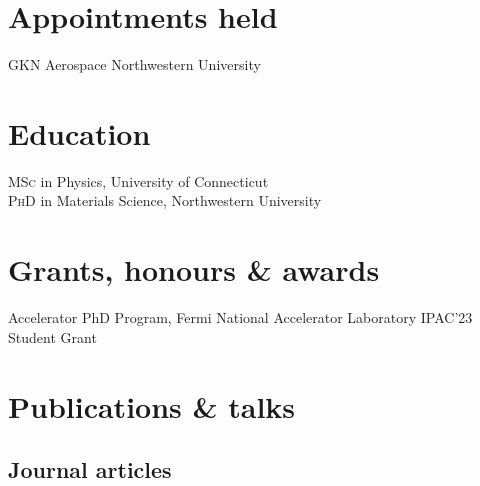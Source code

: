 \documentclass[11pt]{article} %
\begin{document}

\section*{Appointments held}

GKN Aerospace
Northwestern University


\section*{Education}

\textsc{MSc} in Physics, University of Connecticut\\
\textsc{PhD} in Materials Science, Northwestern University


\section*{Grants, honours \& awards}

Accelerator PhD Program, Fermi National Accelerator Laboratory
IPAC'23 Student Grant


\section*{Publications \& talks}

\subsection*{Journal articles}
\end{document}
